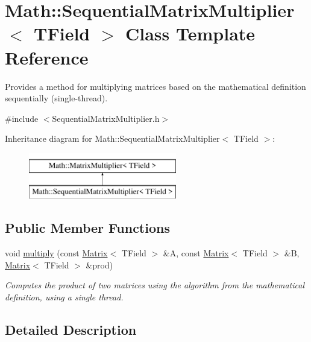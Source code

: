 \hypertarget{classMath_1_1SequentialMatrixMultiplier}{}\section{Math\+:\+:Sequential\+Matrix\+Multiplier$<$ T\+Field $>$ Class Template Reference}
\label{classMath_1_1SequentialMatrixMultiplier}


Provides a method for multiplying matrices based on the mathematical definition sequentially (single-\/thread).  




{\ttfamily \#include $<$Sequential\+Matrix\+Multiplier.\+h$>$}

Inheritance diagram for Math\+:\+:Sequential\+Matrix\+Multiplier$<$ T\+Field $>$\+:\begin{figure}[H]
\begin{center}
\leavevmode
\includegraphics[height=2.000000cm]{classMath_1_1SequentialMatrixMultiplier}
\end{center}
\end{figure}
\subsection*{Public Member Functions}
\begin{DoxyCompactItemize}
\item 
void \mbox{\hyperlink{classMath_1_1SequentialMatrixMultiplier_ac50584976bf8efe3a0a755048c427753}{multiply}} (const \mbox{\hyperlink{classMath_1_1Matrix}{Matrix}}$<$ T\+Field $>$ \&A, const \mbox{\hyperlink{classMath_1_1Matrix}{Matrix}}$<$ T\+Field $>$ \&B, \mbox{\hyperlink{classMath_1_1Matrix}{Matrix}}$<$ T\+Field $>$ \&prod)
\begin{DoxyCompactList}\small\item\em Computes the product of two matrices using the algorithm from the mathematical definition, using a single thread. \end{DoxyCompactList}\end{DoxyCompactItemize}


\subsection{Detailed Description}
